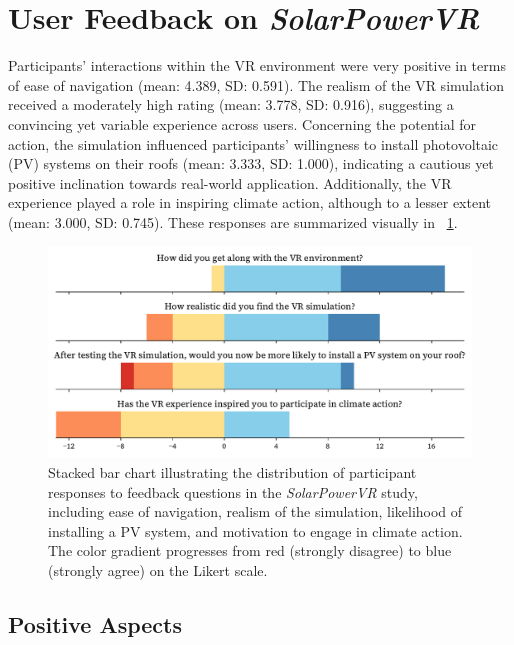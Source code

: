 \documentclass[draft, final]{vutinfth} %
\begin{document}
\section{User Feedback on \textit{SolarPowerVR}}

Participants' interactions within the VR environment were very positive in terms of ease of navigation (mean: 4.389, SD: 0.591).
The realism of the VR simulation received a moderately high rating (mean: 3.778, SD: 0.916), suggesting a convincing yet variable experience across users.
Concerning the potential for action, the simulation influenced participants' willingness to install photovoltaic (PV) systems on their roofs (mean: 3.333, SD: 1.000), indicating a cautious yet positive inclination towards real-world application.
Additionally, the VR experience played a role in inspiring climate action, although to a lesser extent (mean: 3.000, SD: 0.745).
These responses are summarized visually in \figurename~\ref{fig:feedback-solarpowervr}.

\begin{figure}[h]
    \centering
    \includegraphics[width=\textwidth]{graphics/feedback-solarpowervr.pdf}
    \caption{Stacked bar chart illustrating the distribution of participant responses to feedback questions in the \textit{SolarPowerVR} study, including ease of navigation, realism of the simulation, likelihood of installing a PV system, and motivation to engage in climate action.  The color gradient progresses from red (strongly disagree) to blue (strongly agree) on the Likert scale.}
    \label{fig:feedback-solarpowervr}
\end{figure}

\subsection{Positive Aspects}
\end{document}
